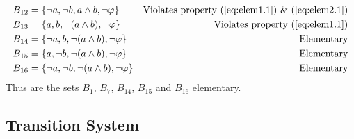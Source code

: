 \begin{example}
\begin{align*}
    B_{12} &= \left\{ \lnot a, \lnot b, a\land b,         \lnot \phi \right\} &\text{Violates property (\ref{eq:elem1.1}) \& (\ref{eq:elem2.1})} \\
    B_{13} &= \left\{ a,       b,       \lnot (a\land b), \lnot \phi \right\} &\text{Violates property (\ref{eq:elem1.1})} \\
    B_{14} &= \left\{ \lnot a, b,       \lnot (a\land b), \lnot \phi \right\} &\text{Elementary} \\
    B_{15} &= \left\{ a,       \lnot b, \lnot (a\land b), \lnot \phi \right\} &\text{Elementary} \\
    B_{16} &= \left\{ \lnot a, \lnot b, \lnot (a\land b), \lnot \phi \right\} &\text{Elementary} 
\end{align*}
Thus are the sets $B_1$, $B_7$, $B_{14}$, $B_{15}$ and $B_{16}$ elementary.
\end{example}

\subsection{Transition System}